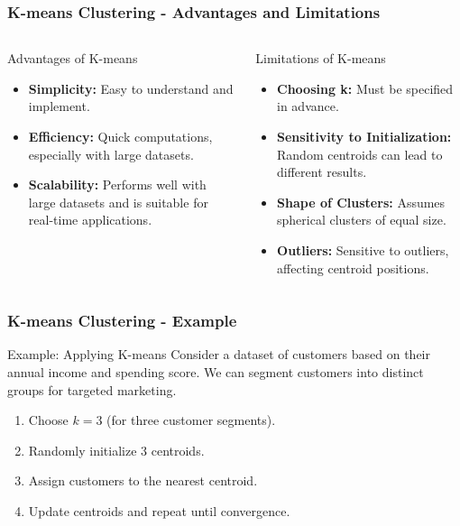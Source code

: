 \documentclass[aspectratio=169]{beamer}
\begin{document}
\begin{frame}[fragile]
    \frametitle{K-means Clustering - Advantages and Limitations}
    \begin{columns}
        \begin{column}{0.5\textwidth}
            \begin{block}{Advantages of K-means}
                \begin{itemize}
                    \item \textbf{Simplicity:} Easy to understand and implement.
                    \item \textbf{Efficiency:} Quick computations, especially with large datasets.
                    \item \textbf{Scalability:} Performs well with large datasets and is suitable for real-time applications.
                \end{itemize}
            \end{block}
        \end{column}

        \begin{column}{0.5\textwidth}
            \begin{block}{Limitations of K-means}
                \begin{itemize}
                    \item \textbf{Choosing k:} Must be specified in advance.
                    \item \textbf{Sensitivity to Initialization:} Random centroids can lead to different results.
                    \item \textbf{Shape of Clusters:} Assumes spherical clusters of equal size.
                    \item \textbf{Outliers:} Sensitive to outliers, affecting centroid positions.
                \end{itemize}
            \end{block}
        \end{column}
    \end{columns}
\end{frame}

\begin{frame}[fragile]
    \frametitle{K-means Clustering - Example}
    \begin{block}{Example: Applying K-means}
        Consider a dataset of customers based on their annual income and spending score. We can segment customers into distinct groups for targeted marketing.
        \begin{enumerate}
            \item Choose \( k=3 \) (for three customer segments).
            \item Randomly initialize 3 centroids.
            \item Assign customers to the nearest centroid.
            \item Update centroids and repeat until convergence.
        \end{enumerate}
    \end{block}
\end{frame}
\end{document}
